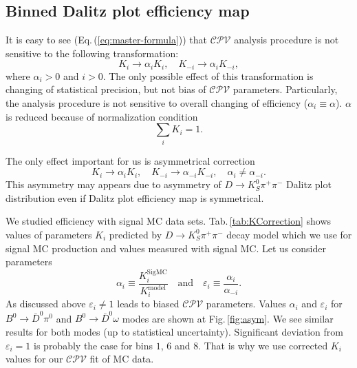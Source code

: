 \documentclass[preprint,aps,showpacs]{revtex4}
\newcommand{\cpvconj}{\ensuremath{\mathcal{CPV}}\xspace}
\newcommand{\dkpp}{\ensuremath{D\to K^0_S\pi^+\pi^-}\xspace}
\newcommand{\bdpi}{\ensuremath{B^0\to \bar D^0\pi^0}\xspace}
\newcommand{\bdomega}{\ensuremath{B^0\to \bar D^0\omega}\xspace}
\begin{document}
\subsection{Binned Dalitz plot efficiency map}\label{sec:efficiency}
It is easy to see (Eq.\,(\ref{eq:master-formula})) that \cpvconj analysis procedure is not sensitive to the following transformation:
\begin{equation}\label{eq:effi}
 K_i\to\alpha_i K_i,\quad K_{-i}\to\alpha_i K_{-i},
\end{equation}
where $\alpha_i>0$ and $i>0$. The only possible effect of this transformation is changing of statistical precision, but not bias of \cpvconj parameters. Particularly, the analysis procedure is not sensitive to overall changing of efficiency ($\alpha_i\equiv\alpha$). $\alpha$ is reduced because of normalization condition
\begin{equation}
 \sum_i K_i = 1.
\end{equation}

The only effect important for us is asymmetrical correction
\begin{equation}\label{eq:effi1}
 K_i\to\alpha_i K_i,\quad K_{-i}\to\alpha_{-i} K_{-i},\quad \alpha_i\neq\alpha_{-i}.
\end{equation}
This asymmetry may appears due to asymmetry of \dkpp Dalitz plot distribution even if Dalitz plot efficiency map is symmetrical.

We studied efficiency with signal MC data sets. Tab.\,\ref{tab:KCorrection} shows values of parameters $K_i$ predicted by \dkpp decay model which we use for signal MC production and values measured with signal MC. Let us consider parameters
\begin{equation}\label{eq:effi_asym}
 \alpha_i\equiv\frac{K^{\text{SigMC}}_{i}}{K^{\text{model}}_{i}} \quad\text{and}\quad   \varepsilon_i\equiv\frac{\alpha_i}{\alpha_{-i}}.
\end{equation}
As discussed above $\varepsilon_i\neq 1$ leads to biased \cpvconj parameters. Values $\alpha_i$ and $\varepsilon_i$ for \bdpi and \bdomega modes are shown at Fig.\,\ref{fig:asym}. We see similar results for both modes (up to statistical uncertainty). Significant deviation from $\varepsilon_i = 1$ is probably the case for bins $1$, $6$ and $8$. That is why we use corrected $K_i$ values for our \cpvconj fit of MC data.
\end{document}
